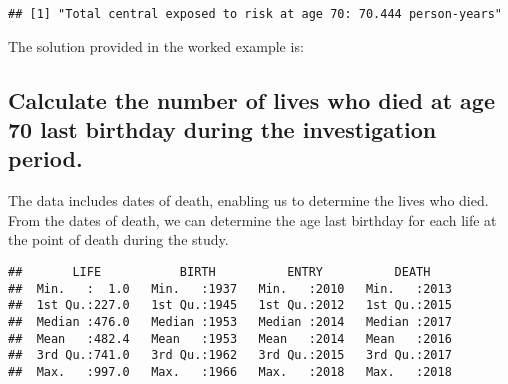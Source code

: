 \documentclass[
]{article}
\newenvironment{Shaded}{\begin{snugshade}}{\end{snugshade}}
\newcommand{\AttributeTok}[1]{\textcolor[rgb]{0.13,0.29,0.53}{#1}}
\newcommand{\CommentTok}[1]{\textcolor[rgb]{0.56,0.35,0.01}{\textit{#1}}}
\newcommand{\ConstantTok}[1]{\textcolor[rgb]{0.56,0.35,0.01}{#1}}
\newcommand{\DecValTok}[1]{\textcolor[rgb]{0.00,0.00,0.81}{#1}}
\newcommand{\FloatTok}[1]{\textcolor[rgb]{0.00,0.00,0.81}{#1}}
\newcommand{\FunctionTok}[1]{\textcolor[rgb]{0.13,0.29,0.53}{\textbf{#1}}}
\newcommand{\NormalTok}[1]{#1}
\newcommand{\OtherTok}[1]{\textcolor[rgb]{0.56,0.35,0.01}{#1}}
\newcommand{\SpecialCharTok}[1]{\textcolor[rgb]{0.81,0.36,0.00}{\textbf{#1}}}
\newcommand{\StringTok}[1]{\textcolor[rgb]{0.31,0.60,0.02}{#1}}
\begin{document}
\begin{Shaded}
\end{Shaded}

\begin{verbatim}
## [1] "Total central exposed to risk at age 70: 70.444 person-years"
\end{verbatim}

The solution provided in the worked example is:

\subsection{Calculate the number of lives who died at age 70 last
birthday during the investigation
period.}\label{calculate-the-number-of-lives-who-died-at-age-70-last-birthday-during-the-investigation-period.}

The data includes dates of death, enabling us to determine the lives who
died. From the dates of death, we can determine the age last birthday
for each life at the point of death during the study.

\begin{Shaded}
\end{Shaded}

\begin{verbatim}
##       LIFE           BIRTH          ENTRY          DEATH     
##  Min.   :  1.0   Min.   :1937   Min.   :2010   Min.   :2013  
##  1st Qu.:227.0   1st Qu.:1945   1st Qu.:2012   1st Qu.:2015  
##  Median :476.0   Median :1953   Median :2014   Median :2017  
##  Mean   :482.4   Mean   :1953   Mean   :2014   Mean   :2016  
##  3rd Qu.:741.0   3rd Qu.:1962   3rd Qu.:2015   3rd Qu.:2017  
##  Max.   :997.0   Max.   :1966   Max.   :2018   Max.   :2018
\end{verbatim}
\end{document}
